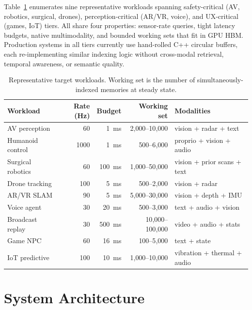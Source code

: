 \documentclass[11pt]{article}
\begin{document}
Table~\ref{tab:workloads} enumerates nine representative workloads
spanning safety-critical (AV, robotics, surgical, drones),
perception-critical (AR/VR, voice), and UX-critical (games, IoT) tiers.
All share four properties: sensor-rate queries, tight latency budgets, native
multimodality, and bounded working sets that fit in GPU HBM. Production
systems in all tiers currently use hand-rolled C++ circular buffers,
each re-implementing similar indexing logic without cross-modal
retrieval, temporal awareness, or semantic quality.

\begin{table}[ht]
\centering
\small
\caption{Representative target workloads. Working set is the number of
simultaneously-indexed memories at steady state.}
\label{tab:workloads}
\begin{tabular}{lrrrl}
\toprule
\textbf{Workload} & \textbf{Rate (Hz)} & \textbf{Budget} & \textbf{Working set} & \textbf{Modalities} \\
\midrule
AV perception      &  60 & 1~ms      &  2{,}000--10{,}000 & vision + radar + text \\
Humanoid control   & 1000 & 1~ms     &    500--6{,}000    & proprio + vision + audio \\
Surgical robotics  &  60 & 100~ms    &  1{,}000--50{,}000 & vision + prior scans + text \\
Drone tracking     & 100 & 5~ms      &    500--2{,}000    & vision + radar \\
AR/VR SLAM         &  90 & 5~ms      &  5{,}000--30{,}000 & vision + depth + IMU \\
Voice agent        &  30 & 20~ms     &    500--3{,}000    & text + audio + vision \\
Broadcast replay   &  30 & 500~ms    & 10{,}000--100{,}000 & video + audio + stats \\
Game NPC           &  60 & 16~ms     &    100--5{,}000    & text + state \\
IoT predictive     & 100 & 10~ms     &  1{,}000--10{,}000 & vibration + thermal + audio \\
\bottomrule
\end{tabular}
\end{table}

\section{System Architecture}
\label{sec:architecture}
\end{document}
